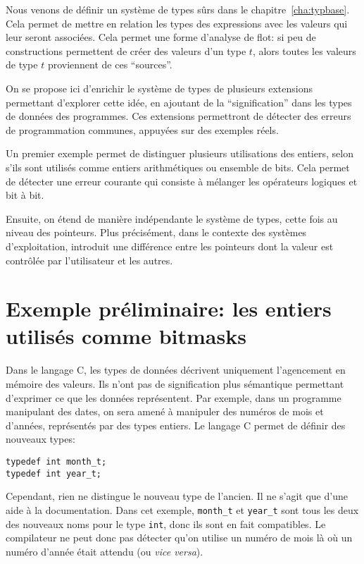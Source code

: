 

Nous venons de définir un système de types sûrs dans le
chapitre~\ref{cha:typbase}. Cela permet de mettre en relation les types des
expressions avec les valeurs qui leur seront associées. Cela permet une forme
d'analyse de flot: si peu de constructions permettent de créer des valeurs d'un
type $t$, alors toutes les valeurs de type $t$ proviennent de ces
\enquote{sources}.

On se propose ici d'enrichir le système de types de plusieurs extensions
permettant d'explorer cette idée, en ajoutant de la \enquote{signification} dans
les types de données des programmes. Ces extensions permettront de détecter des
erreurs de programmation communes, appuyées sur des exemples réels.

Un premier exemple permet de distinguer plusieurs utilisations des entiers,
selon s'ils sont utilisés comme entiers arithmétiques ou ensemble de bits. Cela
permet de détecter une erreur courante qui consiste à mélanger les opérateurs
logiques et bit à bit.

Ensuite, on étend de manière indépendante le système de types, cette fois au
niveau des pointeurs. Plus précisément, dans le contexte des systèmes
d'exploitation, introduit une différence entre les pointeurs dont la valeur est
contrôlée par l'utilisateur et les autres.

\section{Exemple préliminaire: les entiers utilisés comme bitmasks}

Dans le langage C, les types de données décrivent uniquement l'agencement en
mémoire des valeurs. Ils n'ont pas de signification plus sémantique permettant
d'exprimer ce que les données représentent. Par exemple, dans un programme
manipulant des dates, on sera amené à manipuler des numéros de mois et d'années,
représentés par des types entiers. Le langage C permet de définir des nouveaux
types:

\begin{verbatim}
typedef int month_t;
typedef int year_t;
\end{verbatim}

Cependant, rien ne distingue le nouveau type de l'ancien. Il ne s'agit que d'une
aide à la documentation. Dans cet exemple, \texttt{month\_t} et \texttt{year\_t}
sont tous les deux des nouveaux noms pour le type \texttt{int}, donc ils sont en
fait compatibles. Le compilateur ne peut donc pas détecter qu'on utilise un
numéro de mois là où un numéro d'année était attendu (ou \emph{vice versa}).

